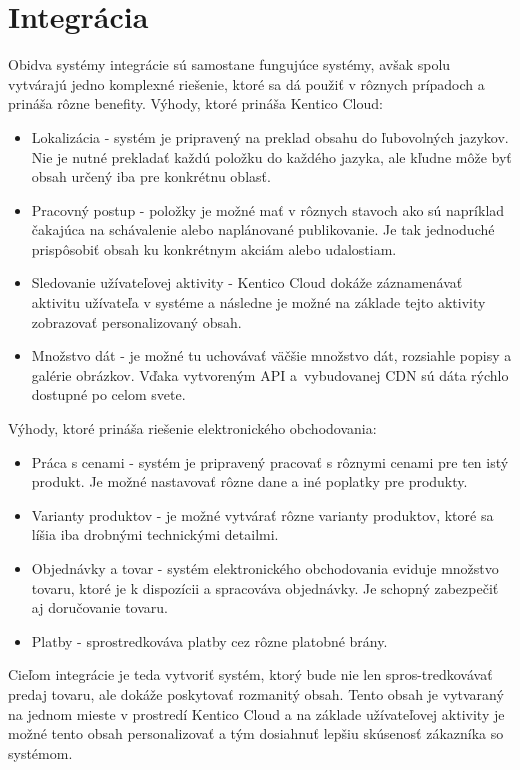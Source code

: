 \documentclass[
  printed, %
  table,   %
  lof,     %
  nolot,     %
  twoside,  
]{fithesis3}
\begin{document}
\chapter{Integrácia}
Obidva systémy integrácie sú samostane fungujúce systémy, avšak spolu vytvárajú jedno komplexné riešenie, ktoré sa dá použiť v rôznych prípadoch a prináša rôzne benefity. Výhody, ktoré prináša Kentico Cloud: 
\begin{itemize}
	\item Lokalizácia - systém je pripravený na preklad obsahu do ľubovolných jazykov. Nie je nutné prekladať každú položku do každého jazyka, ale kľudne môže byť obsah určený iba pre konkrétnu oblasť.
	\item Pracovný postup - položky je možné mať v rôznych stavoch ako sú napríklad čakajúca na schávalenie alebo naplánované publikovanie. Je tak jednoduché prispôsobiť obsah ku konkrétnym akciám alebo udalostiam.
 	\item Sledovanie užívateľovej aktivity - Kentico Cloud dokáže záznamenávať aktivitu užívateľa v systéme a následne je možné na základe tejto aktivity zobrazovať personalizovaný obsah.
 	\item Množstvo dát - je možné tu uchovávať väčšie množstvo dát, rozsiahle popisy a galérie obrázkov. Vďaka vytvoreným API a~vybudovanej CDN sú dáta rýchlo dostupné po celom svete.
\end{itemize}

Výhody, ktoré prináša riešenie elektronického obchodovania:
\begin{itemize}
	\item Práca s cenami - systém je pripravený pracovať s rôznymi cenami pre ten istý produkt. Je možné nastavovať rôzne dane a iné poplatky pre produkty.
	\item Varianty produktov - je možné vytvárať rôzne varianty produktov, ktoré sa líšia iba drobnými technickými detailmi.
 	\item Objednávky a tovar - systém elektronického obchodovania eviduje množstvo tovaru, ktoré je k dispozícii a spracováva objednávky. Je schopný zabezpečiť aj doručovanie tovaru.
 	\item Platby - sprostredkováva platby cez rôzne platobné brány.
\end{itemize}

Cieľom integrácie je teda vytvoriť systém, ktorý bude nie len spros-tredkovávať predaj tovaru, ale dokáže poskytovať rozmanitý obsah. Tento obsah je vytvaraný na jednom mieste v prostredí Kentico Cloud a na základe užívateľovej aktivity je možné tento obsah personalizovať a tým dosiahnuť lepšiu skúsenosť zákazníka so systémom.
\end{document}
